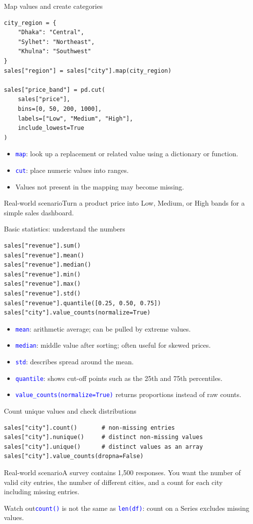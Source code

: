 \documentclass[aspectratio=169,10pt]{beamer}
\newcommand{\scenario}[1]{\begin{block}{Real-world scenario}#1\end{block}}
\newcommand{\pitfall}[1]{\begin{alertblock}{Watch out}#1\end{alertblock}}
\newcommand{\method}[1]{\texttt{\textcolor{Blue}{#1}}}
\begin{document}
\begin{frame}[fragile]{Map values and create categories}
\begin{lstlisting}
city_region = {
    "Dhaka": "Central",
    "Sylhet": "Northeast",
    "Khulna": "Southwest"
}
sales["region"] = sales["city"].map(city_region)

sales["price_band"] = pd.cut(
    sales["price"],
    bins=[0, 50, 200, 1000],
    labels=["Low", "Medium", "High"],
    include_lowest=True
)
\end{lstlisting}
\begin{itemize}
\item \method{map}: look up a replacement or related value using a dictionary or function.
\item \method{cut}: place numeric values into ranges.
\item Values not present in the mapping may become missing.
\end{itemize}
\scenario{Turn a product price into Low, Medium, or High bands for a simple sales dashboard.}
\end{frame}

\begin{frame}[fragile]{Basic statistics: understand the numbers}
\begin{lstlisting}
sales["revenue"].sum()
sales["revenue"].mean()
sales["revenue"].median()
sales["revenue"].min()
sales["revenue"].max()
sales["revenue"].std()
sales["revenue"].quantile([0.25, 0.50, 0.75])
sales["city"].value_counts(normalize=True)
\end{lstlisting}
\begin{itemize}
\item \method{mean}: arithmetic average; can be pulled by extreme values.
\item \method{median}: middle value after sorting; often useful for skewed prices.
\item \method{std}: describes spread around the mean.
\item \method{quantile}: shows cut-off points such as the 25th and 75th percentiles.
\item \method{value\_counts(normalize=True)} returns proportions instead of raw counts.
\end{itemize}
\end{frame}

\begin{frame}[fragile]{Count unique values and check distributions}
\begin{lstlisting}
sales["city"].count()       # non-missing entries
sales["city"].nunique()     # distinct non-missing values
sales["city"].unique()      # distinct values as an array
sales["city"].value_counts(dropna=False)
\end{lstlisting}
\scenario{A survey contains 1,500 responses. You want the number of valid city entries, the number of different cities, and a count for each city including missing entries.}
\pitfall{\method{count()} is not the same as \method{len(df)}: count on a Series excludes missing values.}
\end{frame}
\end{document}
